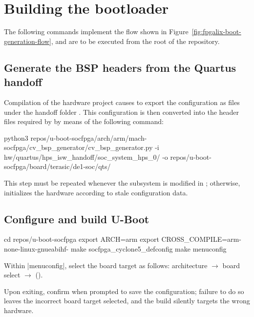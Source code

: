 \section{Building the bootloader}
\label{sec:fpgalix-bootloader}

The following commands implement the flow shown in Figure~\ref{fig:fpgalix-boot-generation-flow}, and are to be executed from the root of the repository.

\subsection{Generate the BSP headers from the Quartus handoff}

Compilation of the hardware project causes  to export the  configuration as  files under the handoff folder . This configuration is then converted into the  header files required by  by means of the following command:

\begin{shellcodehost}
python3 repos/u-boot-socfpga/arch/arm/mach-socfpga/cv_bsp_generator/cv_bsp_generator.py
    -i hw/quartus/hps_isw_handoff/soc_system_hps_0/
    -o repos/u-boot-socfpga/board/terasic/de1-soc/qts/
\end{shellcodehost}

This step must be repeated whenever the  subsystem is modified in ; otherwise,  initializes the hardware according to stale configuration data.

\subsection{Configure and build U-Boot}

\begin{shellcodehost}
cd repos/u-boot-socfpga
export ARCH=arm
export CROSS_COMPILE=arm-none-linux-gnueabihf-
make socfpga_cyclone5_defconfig
make menuconfig
\end{shellcodehost}

Within |menuconfig|, select the board target as follows:  architecture $\rightarrow$   board select $\rightarrow$   ().

Upon exiting, confirm  when prompted to save the configuration; failure to do so leaves the incorrect board target selected, and the build silently targets the wrong hardware.

